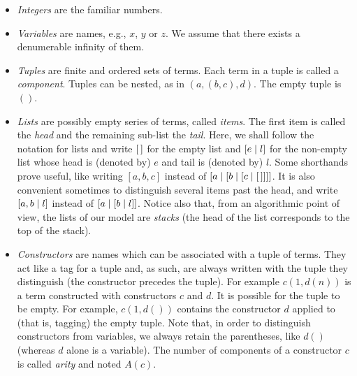 \begin{itemize}

  \item \emph{Integers} are the familiar numbers.

  \item \emph{Variables} are names, e.g., \(x\), \(y\) or \(z\). We
    assume that there exists a denumerable infinity of them.

  \item \emph{Tuples} are finite and ordered sets of terms.  Each term
    in a tuple is called a \emph{component}. Tuples can be nested, as
    in \((a, (b, c), d)\).  The empty tuple is \(()\).

  \item \emph{Lists} are possibly empty series of terms, called
    \emph{items}. The first item is called the \emph{head} and the
    remaining sub\hyp{}list the \emph{tail}. Here, we shall follow the
    \Prolog notation for lists and write \([\,]\) for the empty list
    and \([{e}\mid{l}]\) for the non\hyp{}empty list whose head is
    (denoted by) \(e\) and tail is (denoted by) \(l\). Some shorthands
    prove useful, like writing \([a, b, c]\) instead of
    \([{a}\mid{[{b}\mid{[{c}\mid{[\,]}]}]}]\). It is also convenient
    sometimes to distinguish several items past the head, and write
    \([{a, b}\mid{l}]\) instead of \([{a}\mid{[{b}\mid{l}]}]\).  Notice
    also that, from an algorithmic point of view, the lists of our
    model are \emph{stacks} (the head of the list corresponds to the
    top of the stack).

  \item \emph{Constructors} are names which can be associated with a
    tuple of terms. They act like a tag for a tuple and, as such, are
    always written with the tuple they distinguish (the constructor
    precedes the tuple).  For example \(c(1, d(n))\) is a term
    constructed with constructors \(c\) and \(d\). It is possible for
    the tuple to be empty.
    For example, \(c(1, d())\) contains the
    constructor \(d\) applied to (that is, tagging) the empty tuple.
    Note that, in order to distinguish constructors from variables, we
    always retain the parentheses, like \(d()\) (whereas \(d\) alone
    is a variable). The number of components of a constructor \(c\) is
    called \emph{arity} and noted \(A(c)\).


\end{itemize}
